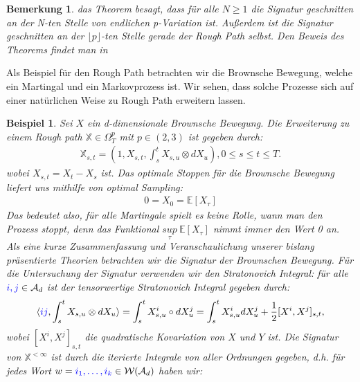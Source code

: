 \documentclass[12pt,titlepage,headsepline]{article}
\newtheorem{beispiel}[definition]{Beispiel}
\newtheorem*{bemerkung*}{Bemerkung}
\begin{document}
      \begin{bemerkung*}
        \textup{
        das Theorem besagt, dass für alle $N \geq 1$ die Signatur geschnitten an der N-ten Stelle von endlichen p-Variation ist. Außerdem ist die Signatur geschnitten an der $\lfloor p\rfloor$-ten Stelle gerade der Rough Path selbst. Den Beweis des Theorems findet man in \cite{lyons_differential_2007, Theorem 3.7}
        }
      \end{bemerkung*}
      Als Beispiel für den Rough Path betrachten wir die Brownsche Bewegung, welche ein Martingal und ein Markovprozess ist. Wir sehen, dass solche Prozesse sich auf einer natürlichen Weise zu Rough Path erweitern lassen.
      \begin{beispiel}\label{rough_path: brownian_motion}
        \textup{
        Sei $X$ ein d-dimensionale Brownsche Bewegung. Die Erweiterung zu einem Rough path $\mathbb{X} \in \Omega_T^p$ mit $p \in (2,3)$ ist gegeben durch:
        \begin{align*}
          \mathbb{X}_{s,t} = (1,X_{s,t},\int_s^t X_{s,u} \otimes dX_u), 0 \leq s \leq t \leq T.
        \end{align*}
        wobei $X_{s,t} = X_t - X_s$ ist.
        \hfill\break
        Das optimale Stoppen für die Brownsche Bewegung liefert uns mithilfe von optimal Sampling:
        \begin{align*}
          0 = X_0 = \mathbb{E}[X_{\tau}]
        \end{align*}
        Das bedeutet also, für alle Martingale spielt es keine Rolle, wann man den Prozess stoppt, denn das Funktional $\underset{\tau}{sup} \ \mathbb{E}[X_{\tau}]$ nimmt immer den Wert 0 an.
        \hfill\break
        Als eine kurze Zusammenfassung und Veranschaulichung unserer bislang präsentierte Theorien betrachten wir die Signatur der Brownschen Bewegung. Für die Untersuchung der Signatur verwenden wir den Stratonovich Integral: für alle $\textcolor{blue}{i,j} \in \mathcal{A}_d$ ist der tensorwertige Stratonovich Integral gegeben durch:
        \begin{align*}
          \langle \textcolor{blue}{ij}, \int_s^t X_{s,u} \otimes dX_u \rangle = \int_s^t X_{s,u}^i \circ dX_u^j = \int_s^t X_{s,u}^i dX_u^j + \frac{1}{2}[X^i,X^j]_{s,t},
        \end{align*}
        wobei $[X^i,X^j]_{s,t}$ die quadratische Kovariation von $X$ und $Y$ ist. Die Signatur von $\mathbb{X}^{<\infty}$ ist durch die iterierte Integrale von aller Ordnungen gegeben, d.h. für jedes Wort $w=\textcolor{blue}{i_1,\ldots,i_k} \in \mathcal{W}(\mathcal{A}_d)$ haben wir:
}
\end{beispiel}
\end{document}
